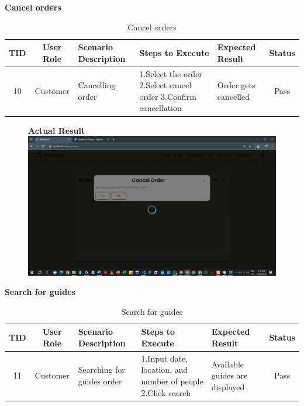 \textbf{Cancel orders}\\
\begin{table}[ht]
\centering
\begin{tabularx}{\textwidth}{|c|c|X|X|X|c|}
\hline
\textbf{TID} & \textbf{User Role} & \textbf{Scenario Description} & \textbf{Steps to Execute} & \textbf{Expected Result} & \textbf{Status} \\ \hline
10 & Customer & Cancelling order & 1.Select the order \newline2.Select cancel order \newline3.Confirm cancellation & Order gets cancelled & Pass \\ \hline
\end{tabularx}
\caption{Cancel orders}
\end{table}

\begin{figure}[h!]
    \centering
    \textbf{Actual Result}
    \includegraphics[width=1\textwidth]{Images/Test Cases/10. cancel order.png}
\end{figure}
\clearpage


\textbf{Search for guides}\\
\begin{table}[ht]
\centering
\begin{tabularx}{\textwidth}{|c|c|X|X|X|c|}
\hline
\textbf{TID} & \textbf{User Role} & \textbf{Scenario Description} & \textbf{Steps to Execute} & \textbf{Expected Result} & \textbf{Status} \\ \hline
11 & Customer & Searching for guides order & 1.Input date, location, and number of people \newline2.Click search & Available guides are displayed & Pass \\ \hline
\end{tabularx}
\caption{Search for guides}
\end{table}

